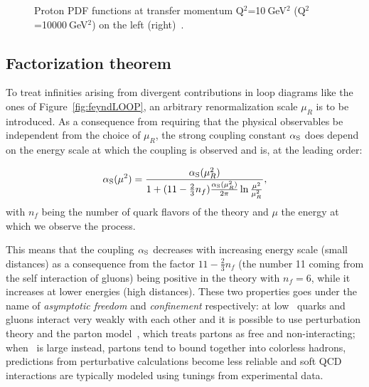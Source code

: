 \begin{figure}[tbph]
\begin{center}
\caption{Proton PDF functions at transfer momentum
 Q$^2$=10$~$GeV$^2$ (Q$^2$=10000$~$GeV$^2$) on the left (right)~\cite{Martin:2009iq}.\label{fig:PDFs}}
\end{center}
\end{figure}



\subsection{Factorization theorem}\label{sec:factorization}

To treat infinities arising from divergent contributions in loop diagrams like
the ones of Figure~\ref{fig:feyndLOOP},
an arbitrary renormalization scale $\mu_R$ is to be introduced. As a consequence
from requiring that the physical observables be independent from the choice of $\mu_R$,
the strong coupling constant $\alphas$ does depend on the energy scale at which the 
coupling is observed and is, at the leading order:

\begin{equation}\label{eq:alphas}
\alphas(\mu^2) = \dfrac{\alphas(\mu_R^2)}{1 + (11 - \frac{2}{3}n_f)\frac{\alphas(\mu_R^2)}{2\pi}\ln\frac{\mu^2}{\mu_R^2} }, 
\end{equation}
with $n_f$ being the number of quark flavors of the theory and $\mu$ the energy at which we observe the process.

This means that the coupling $\alphas$ decreases with increasing energy scale (small distances)
as a consequence from the factor $11 - \frac{2}{3}n_f$ (the number 11 coming from the self interaction of gluons)
being positive in the theory with $n_f = 6$,
while it increases at lower energies (high distances). These two properties goes under the name of
{\it asymptotic freedom} and {\it confinement} respectively: at low \alphas\ quarks and gluons interact very weakly with 
each other and it is possible to use perturbation theory and the parton model~\cite{Feynman:1969ej}, 
which treats partons as free and non-interacting; when \alphas\ is large instead, partons tend to bound together
into colorless hadrons, predictions from perturbative calculations become less reliable and soft QCD interactions
are typically modeled using tunings from experimental data.

